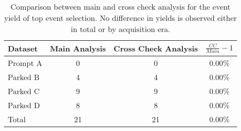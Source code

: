 \begin{table}[!htp]
\centering

\begin{tabular}{|l|c|c||c|}
  \hline
  Dataset & Main Analysis & Cross Check Analysis & $\frac{CC}{Main}-1$ \\ 
  \hline \hline
  Prompt A & 0 & 0 & 0.00\% \\
  Parked B & 4 & 4 & 0.00\% \\
  Parked C & 9 & 9 & 0.00\% \\
  Parked D & 8 & 8 & 0.00\% \\
  \hline \hline
  Total & 21 & 21 & 0.00\% \\
  \hline
\end{tabular}

\caption{Comparison between main and cross check analysis for the event yield of top event selection. No difference in yields is observed either in total or by acquisition era.}
\end{table}
